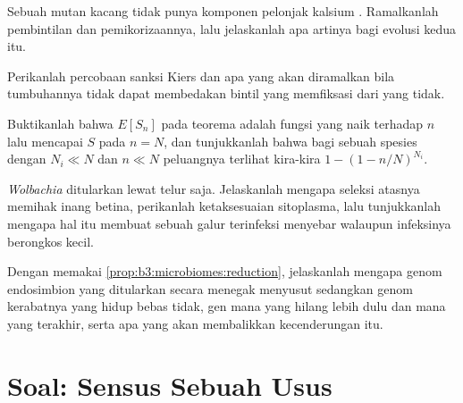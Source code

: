 \begin{exercise}[$\star\star$]\label{exo:b3:microbiomes:8}
Sebuah mutan kacang tidak punya komponen pelonjak kalsium . Ramalkanlah pembintilan dan pemikorizaannya, lalu
jelaskanlah apa artinya bagi evolusi kedua  itu.
\end{exercise}

\begin{exercise}[$\star\star$]\label{exo:b3:microbiomes:9}
Perikanlah percobaan sanksi Kiers dan apa yang akan diramalkan bila
tumbuhannya tidak dapat membedakan bintil yang memfiksasi dari yang tidak.
\end{exercise}

\begin{exercise}[$\star\star\star$]\label{exo:b3:microbiomes:10}
Buktikanlah bahwa $E[S_{n}]$ pada teorema  adalah fungsi yang naik
terhadap $n$ lalu mencapai $S$ pada $n = N$, dan tunjukkanlah bahwa bagi sebuah
spesies dengan $N_{i} \ll N$ dan $n \ll N$ peluangnya terlihat kira-kira
$1 - (1 - n/N)^{N_{i}}$.
\end{exercise}

\begin{exercise}[$\star\star\star$]\label{exo:b3:microbiomes:11}
\emph{Wolbachia} ditularkan lewat telur saja. Jelaskanlah mengapa
seleksi atasnya memihak inang betina, perikanlah ketaksesuaian
sitoplasma, lalu tunjukkanlah mengapa hal itu membuat sebuah galur terinfeksi
menyebar walaupun infeksinya berongkos kecil.
\end{exercise}

\begin{exercise}[$\star\star\star$]\label{exo:b3:microbiomes:12}
Dengan memakai \cref{prop:b3:microbiomes:reduction}, jelaskanlah mengapa genom
endosimbion yang ditularkan secara menegak menyusut sedangkan genom kerabatnya
yang hidup bebas tidak, gen mana yang hilang lebih dulu dan mana yang terakhir,
serta apa yang akan membalikkan kecenderungan itu.
\end{exercise}

\section{Soal: Sensus Sebuah Usus}

